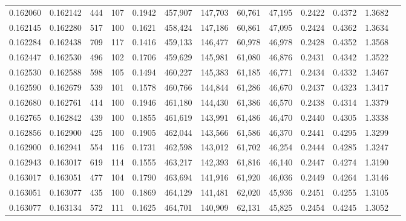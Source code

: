 \begin{tabular}{rrrrrrrrrrrrr}
0.162060 & 0.162142 &   444 & 107 &                                     0.1942 & 457,907 & 147,703 &  60,761 &  47,195 & 0.2422 & 0.4372 & 1.3682 \\
0.162145 & 0.162280 &   517 & 100 &                                     0.1621 & 458,424 & 147,186 &  60,861 &  47,095 & 0.2424 & 0.4362 & 1.3634 \\
0.162284 & 0.162438 &   709 & 117 &                                     0.1416 & 459,133 & 146,477 &  60,978 &  46,978 & 0.2428 & 0.4352 & 1.3568 \\
0.162447 & 0.162530 &   496 & 102 &                                     0.1706 & 459,629 & 145,981 &  61,080 &  46,876 & 0.2431 & 0.4342 & 1.3522 \\
0.162530 & 0.162588 &   598 & 105 &                                     0.1494 & 460,227 & 145,383 &  61,185 &  46,771 & 0.2434 & 0.4332 & 1.3467 \\
0.162590 & 0.162679 &   539 & 101 &                                     0.1578 & 460,766 & 144,844 &  61,286 &  46,670 & 0.2437 & 0.4323 & 1.3417 \\
0.162680 & 0.162761 &   414 & 100 &                                     0.1946 & 461,180 & 144,430 &  61,386 &  46,570 & 0.2438 & 0.4314 & 1.3379 \\
0.162765 & 0.162842 &   439 & 100 &                                     0.1855 & 461,619 & 143,991 &  61,486 &  46,470 & 0.2440 & 0.4305 & 1.3338 \\
0.162856 & 0.162900 &   425 & 100 &                                     0.1905 & 462,044 & 143,566 &  61,586 &  46,370 & 0.2441 & 0.4295 & 1.3299 \\
0.162900 & 0.162941 &   554 & 116 &                                     0.1731 & 462,598 & 143,012 &  61,702 &  46,254 & 0.2444 & 0.4285 & 1.3247 \\
0.162943 & 0.163017 &   619 & 114 &                                     0.1555 & 463,217 & 142,393 &  61,816 &  46,140 & 0.2447 & 0.4274 & 1.3190 \\
0.163017 & 0.163051 &   477 & 104 &                                     0.1790 & 463,694 & 141,916 &  61,920 &  46,036 & 0.2449 & 0.4264 & 1.3146 \\
0.163051 & 0.163077 &   435 & 100 &                                     0.1869 & 464,129 & 141,481 &  62,020 &  45,936 & 0.2451 & 0.4255 & 1.3105 \\
0.163077 & 0.163134 &   572 & 111 &                                     0.1625 & 464,701 & 140,909 &  62,131 &  45,825 & 0.2454 & 0.4245 & 1.3052 \\

\end{tabular}
